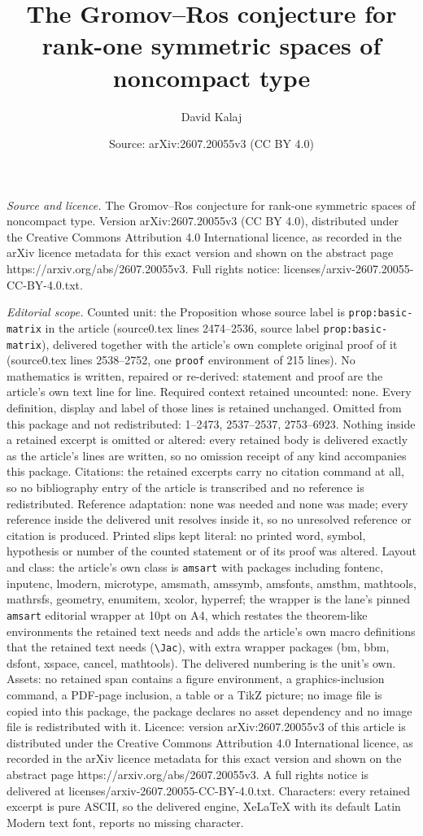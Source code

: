 \documentclass[10pt,a4paper]{amsart}
\title[The Gromov--Ros conjecture for rank-one symmetric spaces of ]{The Gromov--Ros conjecture for rank-one symmetric spaces of noncompact type}
\author{David Kalaj}
\date{Source: arXiv:2607.20055v3 (CC BY 4.0)}
\begin{document}
\maketitle

\noindent\emph{Source and licence.} The Gromov--Ros conjecture for rank-one symmetric spaces of noncompact type. Version arXiv:2607.20055v3 (CC BY 4.0), distributed under the Creative Commons Attribution 4.0 International licence, as recorded in the arXiv licence metadata for this exact version and shown on the abstract page https://arxiv.org/abs/2607.20055v3. Full rights notice: licenses/arxiv-2607.20055-CC-BY-4.0.txt.\par\smallskip

\noindent\textit{Editorial scope.} Counted unit: the Proposition whose source label is \texttt{prop:basic-matrix} in the article (source0.tex lines 2474--2536, source label \texttt{prop:basic-matrix}), delivered together with the article's own complete original proof of it (source0.tex lines 2538--2752, one \texttt{proof} environment of 215 lines). No mathematics is written, repaired or re-derived: statement and proof are the article's own text line for line. Required context retained uncounted: none. Every definition, display and label of those lines is retained unchanged. Omitted from this package and not redistributed: 1--2473, 2537--2537, 2753--6923. Nothing inside a retained excerpt is omitted or altered: every retained body is delivered exactly as the article's lines are written, so no omission receipt of any kind accompanies this package. Citations: the retained excerpts carry no citation command at all, so no bibliography entry of the article is transcribed and no reference is redistributed. Reference adaptation: none was needed and none was made; every reference inside the delivered unit resolves inside it, so no unresolved reference or citation is produced. Printed slips kept literal: no printed word, symbol, hypothesis or number of the counted statement or of its proof was altered. Layout and class: the article's own class is \texttt{amsart} with packages including fontenc, inputenc, lmodern, microtype, amsmath, amssymb, amsfonts, amsthm, mathtools, mathrsfs, geometry, enumitem, xcolor, hyperref; the wrapper is the lane's pinned \texttt{amsart} editorial wrapper at 10pt on A4, which restates the theorem-like environments the retained text needs and adds the article's own macro definitions that the retained text needs (\texttt{\textbackslash Jac}), with extra wrapper packages (bm, bbm, dsfont, xspace, cancel, mathtools). The delivered numbering is the unit's own. Assets: no retained span contains a figure environment, a graphics-inclusion command, a PDF-page inclusion, a table or a TikZ picture; no image file is copied into this package, the package declares no asset dependency and no image file is redistributed with it. Licence: version arXiv:2607.20055v3 of this article is distributed under the Creative Commons Attribution 4.0 International licence, as recorded in the arXiv licence metadata for this exact version and shown on the abstract page https://arxiv.org/abs/2607.20055v3. A full rights notice is delivered at licenses/arxiv-2607.20055-CC-BY-4.0.txt. Characters: every retained excerpt is pure ASCII, so the delivered engine, XeLaTeX with its default Latin Modern text font, reports no missing character.
\end{document}
